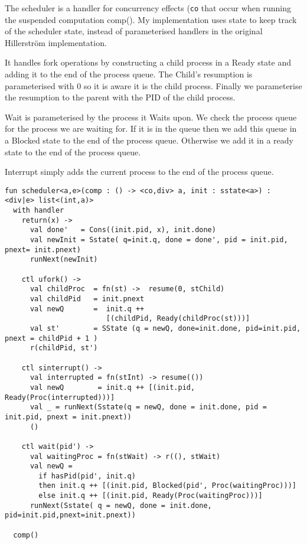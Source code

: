\documentclass[logo,bsc,singlespacing,parskip]{infthesis}
\begin{document}
The scheduler is a handler for concurrency effects (\texttt{co} that occur when running the suspended computation comp(). My implementation uses state to keep track of the scheduler state, instead of parameterised handlers in the original Hillerström implementation. 

It handles fork operations by constructing a child process in a Ready state and adding it to the end of the process queue. The Child's resumption is parameterised with 0 so it is aware it is the child process. Finally we parameterise the resumption to the parent with the PID of the child process.

Wait is parameterised by the process it Waits upon. We check the process queue for the process we are waiting for. If it is in the queue then we add this queue in a Blocked state to the end of the process queue. Otherwise we add it in a ready state to the end of the process queue.

Interrupt simply adds the current process to the end of the process queue.

\begin{lstlisting}
fun scheduler<a,e>(comp : () -> <co,div> a, init : sstate<a>) : <div|e> list<(int,a)>
  with handler
    return(x) -> 
      val done'   = Cons((init.pid, x), init.done)
      val newInit = Sstate( q=init.q, done = done', pid = init.pid, pnext= init.pnext)
      runNext(newInit)

    ctl ufork() -> 
      val childProc  = fn(st) ->  resume(0, stChild)  
      val childPid   = init.pnext
      val newQ       =  init.q ++ 
                        [(childPid, Ready(childProc(st)))]
      val st'        = SState (q = newQ, done=init.done, pid=init.pid, pnext = childPid + 1 )
      r(childPid, st')

    ctl sinterrupt() ->
      val interrupted = fn(stInt) -> resume(())
      val newQ        = init.q ++ [(init.pid, Ready(Proc(interrupted)))]
      val _ = runNext(Sstate(q = newQ, done = init.done, pid = init.pid, pnext = init.pnext))
      ()

    ctl wait(pid') ->
      val waitingProc = fn(stWait) -> r((), stWait)
      val newQ =
        if hasPid(pid', init.q)
        then init.q ++ [(init.pid, Blocked(pid', Proc(waitingProc)))]
        else init.q ++ [(init.pid, Ready(Proc(waitingProc)))]
      runNext(Sstate( q = newQ, done = init.done, pid=init.pid,pnext=init.pnext))
      
  comp()
\end{lstlisting}    
\end{document}
